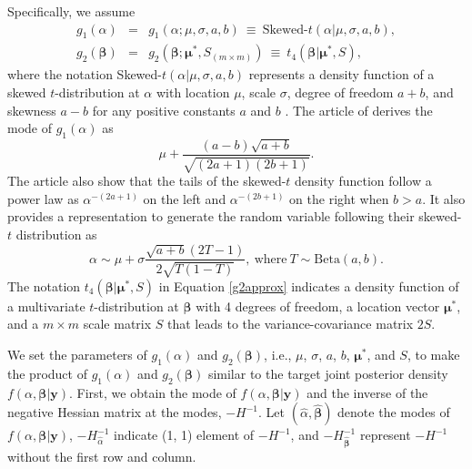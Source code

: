 \documentclass[article]{jss}
\begin{document}
Specifically, we assume
\begin{eqnarray}\label{env}
g_1(\alpha) &=& g_1(\alpha; \mu, \sigma, a, b)~\equiv~\textrm{Skewed-}t(\alpha\vert\mu, \sigma, a, b),\\
g_2(\boldsymbol{\beta}) &=& g_2(\boldsymbol{\beta}; \boldsymbol{\mu}^\ast, S_{(m\times m)})~\equiv~t_{4}(\boldsymbol{\beta}\vert \boldsymbol{\mu}^\ast, S),\label{g2approx}
\end{eqnarray}
where the notation Skewed-$t(\alpha\vert\mu, \sigma, a, b)$ represents a density function of a skewed $t$-distribution  at $\alpha$ with location $\mu$, scale $\sigma$, degree of freedom $a+b$, and skewness $a-b$ for any positive constants $a$ and $b$ \citep{jones2003skew}. The article of \cite{jones2003skew} derives the mode of $g_1(\alpha)$ as
\begin{equation}\label{mode}
\mu+\frac{(a-b)\sqrt{a+b}}{\sqrt{(2a+1)(2b+1)}}.
\end{equation} 
The article also show that the tails of the skewed-$t$ density function  follow a power law as $\alpha^{-(2a+1)}$ on the left and $\alpha^{-(2b+1)}$ on the right when $b>a$. It also provides a representation to generate the random variable following their skewed-$t$ distribution as
\begin{equation}
\alpha\sim \mu+\sigma\frac{\sqrt{a+b}(2T-1)}{2\sqrt{T(1-T)}}, ~\textrm{where}~ T\sim \textrm{Beta}(a, b).
\end{equation}
The notation $t_{4}(\boldsymbol{\beta}\vert\boldsymbol{\mu}^\ast, S)$ in Equation \ref{g2approx} indicates a density function of a multivariate $t$-distribution at $\boldsymbol{\beta}$ with 4 degrees of freedom, a location vector $\boldsymbol{\mu}^\ast$, and a $m\times m$ scale matrix $S$ that leads to the variance-covariance matrix $2S$. 

We set the parameters of $g_1(\alpha)$ and $g_2(\boldsymbol{\beta})$, i.e., $\mu$, $\sigma$, $a$, $b$, $\boldsymbol{\mu}^\ast$, and $S$, to make the product of $g_1(\alpha)$ and $g_2(\boldsymbol{\beta})$ similar to the target joint posterior density $f(\alpha, \boldsymbol{\beta} \vert  \boldsymbol{y})$. First, we obtain the  mode of $f(\alpha, \boldsymbol{\beta} \vert  \boldsymbol{y})$ and the inverse of the  negative Hessian matrix at the modes, $-H^{-1}$. Let $(\hat{\alpha}, \hat{\boldsymbol{\beta}})$ denote the modes of $f(\alpha, \boldsymbol{\beta} \vert  \boldsymbol{y})$, $-H^{-1}_{\hat{\alpha}}$ indicate (1, 1) element of $-H^{-1}$, and $-H^{-1}_{\hat{\boldsymbol{\beta}}}$ represent  $-H^{-1}$ without the first row and  column. 
\end{document}

